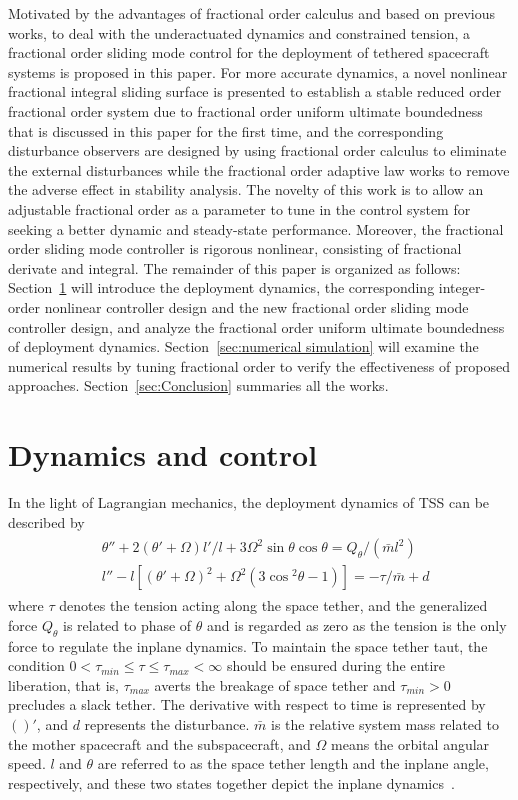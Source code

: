 \documentclass[ShortAfour]{sage}
\theoremstyle{plain}
\theoremstyle{remark}
\begin{document}
Motivated by the advantages of fractional order calculus and based on previous works, to deal with the underactuated dynamics and constrained tension, a fractional order sliding mode control for the deployment of tethered spacecraft systems is proposed in this paper. For more accurate dynamics, a novel nonlinear fractional integral sliding surface is presented to establish a stable reduced order fractional order system due to fractional order uniform ultimate boundedness that is discussed in this paper for the first time, and the corresponding disturbance observers are designed by using fractional order calculus to eliminate the external disturbances while the fractional order adaptive law works to remove the adverse effect in stability analysis. The novelty of this work is to allow an adjustable fractional order as a parameter to tune in the control system for seeking a better dynamic and steady-state performance. Moreover, the fractional order sliding mode controller is rigorous nonlinear, consisting of fractional derivate and integral. The remainder of this paper is organized as follows: Section~\ref{sec:mm} will introduce the deployment dynamics, the corresponding integer-order nonlinear controller design and the new fractional order sliding mode controller design, and analyze the fractional order uniform ultimate boundedness of deployment dynamics. Section~\ref{sec:numerical simulation} will examine the numerical results by tuning fractional order to verify the effectiveness of proposed approaches. Section~\ref{sec:Conclusion} summaries all the works.


\section{Dynamics and control}\label{sec:mm}
In the light of Lagrangian mechanics, the deployment dynamics of TSS can be described by \cite{Williams2009745}
\begin{align} 
\begin{split}
&\theta''+2\left(\theta'+\Omega\right)l'/l+3\Omega^2\sin{\theta} \cos{\theta}=Q_\theta/(\bar{m}l^2)\\
&l''-l\left[\left(\theta'+\Omega\right)^2+\Omega^2\left(3\cos{^2\theta}-1\right)\right]= -\tau/\bar{m}+d\label{eq:motion1}
\end{split}
\end{align}
where $\tau$ denotes the tension acting along the space tether, and the generalized force $Q_\theta$ is related to phase of $\theta$ and is regarded as zero as the tension is the only force to regulate the inplane dynamics. To maintain the space tether taut, the condition $0<\tau_{min}\le \tau\le \tau_{max} < \infty$ should be ensured during the entire liberation, that is, $\tau_{max}$ averts the breakage of space tether and $\tau_{min}>0$ precludes a slack tether. The derivative with respect to time is represented by $()'$, and $d$ represents the disturbance. $\bar m$ is the relative system mass related to the mother spacecraft and the subspacecraft, and $\Omega$ means the orbital angular speed. $l$ and $\theta$ are referred to as the space tether length and the inplane angle, respectively, and these two states together depict the inplane dynamics~\cite{williams2008deployment}.
\end{document}

